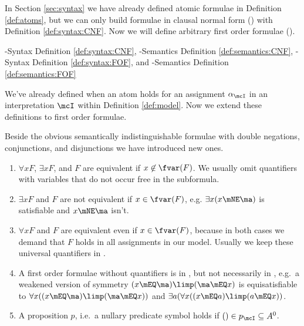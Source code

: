 

In Section \ref{sec:syntax} we have already defined atomic formulae in Definition \ref{def:atoms},
but we can only build formulae in clausal normal form (\CNF) with Definition \vref{def:syntax:CNF}.
Now we will define arbitrary first order formulae (\FOF).

\CNF-Syntax Definition \vref{def:syntax:CNF},
\CNF-Semantics Definition \vref{def:semantics:CNF},
\FOF-Syntax Definition \vref{def:syntax:FOF}, and
\FOF-Semantics Definition \vref{def:semantics:FOF}



We've already defined when an atom holds for an assignment $\alpha_\mcI$
in an interpretation $\mcI$ within Definition \vref{def:model}.
Now we extend these definitions to first order formulae.


%
	Beside the obvious semantically indistinguishable formulae with double negations, conjunctions, and disjunctions
	we have introduced new ones.
	\begin{enumerate}
		\item $\forall x F$, $\exists x F$, and $F$ are equivalent if $x\not\in\fvar(F)$.
		We usually omit quantifiers with variables that do not occur free in the subformula.
		\item $\exists x F$ and $F$ are not equivalent if $x\in\fvar(F)$,
		e.g. $\exists x(x\mNE\ma)$ is satisfiable and $x\mNE\ma$ isn't.
		\item $\forall x F$ and $F$ are equivalent even if $x\in\fvar(F)$,
		because in both cases we demand that $F$ holds in all assignments in our model.
		Usually we keep these universal quantifiers in \FOF.

		\item A first order formulae without quantifiers is in ,
		but not necessarily in \CNF, e.g.~a weakened version of symmetry $(x\mEQ \ma)\limp (\ma\mEQ x)$
		is equisatisfiable to $\forall x ((x\mEQ \ma)\limp (\ma\mEQ x))$
		and $\exists a (\forall x ((x\mEQ a)\limp (a\mEQ x))$.
		\item A proposition $p$, i.e.~a nullary predicate symbol holds if $()\in p_\mcI \subseteq A^0$.
	\end{enumerate}